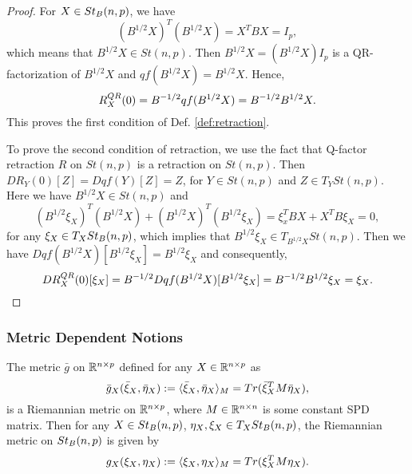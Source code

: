 \documentclass[11pt,a4paper]{article}
\begin{document}
\begin{proof}
For $X\in St_B(n,p)$, we have
\begin{equation*}
(B^{1/2}X)^T(B^{1/2}X) = X^TBX = I_p,
\end{equation*}
which means that $B^{1/2}X\in St(n,p)$. Then $B^{1/2}X = (B^{1/2}X) I_p$ is a QR-factorization of $B^{1/2}X$ and $qf(B^{1/2}X) = B^{1/2}X$. Hence,
\begin{equation*}
R^{QR}_X(0) = B^{-1/2}qf(B^{1/2}X) = B^{-1/2}B^{1/2}X.
\end{equation*}
This proves the first condition of Def. \ref{def:retraction}. 

To prove the second condition of retraction, we use the fact that Q-factor retraction $R$ on $St(n,p)$ is a retraction on $St(n,p)$. Then $DR_Y(0)[Z] = Dqf(Y)[Z] = Z$, for $Y\in St(n,p)$ and $Z\in T_YSt(n,p)$. Here we have $B^{1/2}X\in St(n,p)$ and 
\begin{equation*}
(B^{1/2}\xi_X)^T(B^{1/2}X) + (B^{1/2}X)^T(B^{1/2}\xi_X) = \xi_x^TBX + X^TB\xi_X = 0,
\end{equation*}
for any $\xi_X\in T_XSt_B(n,p)$, which implies that $B^{1/2}\xi_X\in T_{B^{1/2}X}St(n,p)$. Then we have $Dqf(B^{1/2}X)[B^{1/2}\xi_X] = B^{1/2}\xi_X$ and consequently,
\begin{equation*}
DR^{QR}_X(0)[\xi_X] = B^{-1/2}Dqf(B^{1/2}X)[B^{1/2}\xi_X] = B^{-1/2}B^{1/2}\xi_X = \xi_X.
\end{equation*}
\end{proof}

\subsubsection{Metric Dependent Notions}

\begin{prop} \label{prop:preconditioned_metric}
The metric $\bar{g}$ on $\mathbb{R}^{n\times p}$ defined for any $X\in \mathbb{R}^{n\times p}$ as
\begin{equation*}
\bar{g}_X(\bar{\xi}_X,\bar{\eta}_X) := \langle \bar{\xi}_X, \bar{\eta}_X \rangle_M = Tr(\bar{\xi}_X^TM\bar{\eta}_X),
\end{equation*}
is a Riemannian metric on $\mathbb{R}^{n\times p}$, where $M\in\mathbb{R}^{n\times n}$ is some constant SPD matrix. Then for any $X\in St_B(n,p)$, $\eta_X,\xi_X\in T_XSt_B(n,p)$, the Riemannian metric on $St_B(n,p)$ is given by
\begin{equation}
g_X(\xi_X,{\eta}_X) := \langle {\xi}_X, {\eta}_X \rangle_M = Tr({\xi}_X^TM{\eta}_X).
\end{equation}
\end{prop}
\end{document}
